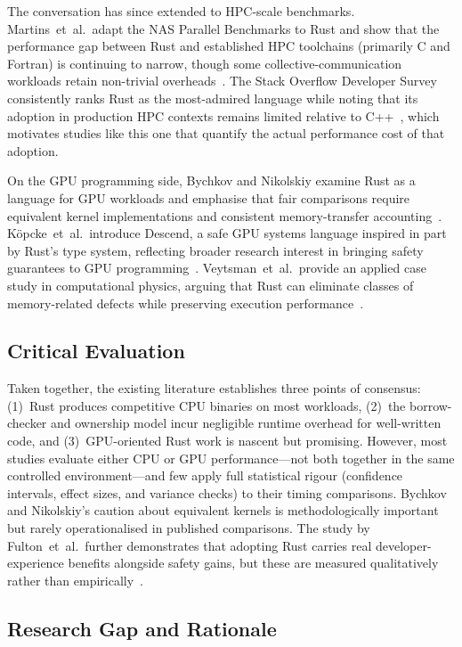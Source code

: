 \documentclass{article}
\begin{document}
The conversation has since extended to HPC-scale benchmarks.
Martins~et~al.\ adapt the NAS Parallel Benchmarks to Rust and show that the
performance gap between Rust and established HPC toolchains (primarily C and
Fortran) is continuing to narrow, though some collective-communication
workloads retain non-trivial overheads~\cite{martins2025npb}.
The Stack Overflow Developer Survey consistently ranks Rust as the
most-admired language while noting that its adoption in production HPC
contexts remains limited relative to C++~\cite{stackoverflowSurvey2024},
which motivates studies like this one that quantify the actual performance
cost of that adoption.

On the GPU programming side, Bychkov and Nikolskiy examine Rust as a
language for GPU workloads and emphasise that fair comparisons require
equivalent kernel implementations and consistent memory-transfer
accounting~\cite{bychkov2022rust}.
K\"{o}pcke~et~al.\ introduce Descend, a safe GPU systems language inspired
in part by Rust's type system, reflecting broader research interest in
bringing safety guarantees to GPU programming~\cite{kopcke2023descend}.
Veytsman~et~al.\ provide an applied case study in computational physics,
arguing that Rust can eliminate classes of memory-related defects while
preserving execution performance~\cite{veytsman2024rewrite}.

\subsection{Critical Evaluation}

Taken together, the existing literature establishes three points of
consensus: (1)~Rust produces competitive CPU binaries on most workloads,
(2)~the borrow-checker and ownership model incur negligible runtime overhead
for well-written code, and (3)~GPU-oriented Rust work is nascent but
promising.
However, most studies evaluate either CPU or GPU performance---not both
together in the same controlled environment---and few apply full statistical
rigour (confidence intervals, effect sizes, and variance checks) to their
timing comparisons.
Bychkov and Nikolskiy's caution about equivalent kernels is methodologically
important but rarely operationalised in published comparisons.
The study by Fulton~et~al.\ further demonstrates that adopting Rust carries
real developer-experience benefits alongside safety gains, but these are
measured qualitatively rather than empirically~\cite{fulton2021benefits}.

\subsection{Research Gap and Rationale}
\end{document}

